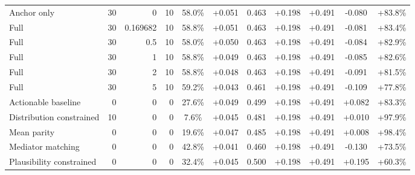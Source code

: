 \begin{table}[htbp]
\begin{tabular}{lrrrccccccc}
Anchor only & 30 & 0 & 10 & 58.0\% & +0.051 & 0.463 & +0.198 & +0.491 & -0.080 & +83.8\% \\
Full & 30 & 0.169682 & 10 & 58.8\% & +0.051 & 0.463 & +0.198 & +0.491 & -0.081 & +83.4\% \\
Full & 30 & 0.5 & 10 & 58.0\% & +0.050 & 0.463 & +0.198 & +0.491 & -0.084 & +82.9\% \\
Full & 30 & 1 & 10 & 58.8\% & +0.049 & 0.463 & +0.198 & +0.491 & -0.085 & +82.6\% \\
Full & 30 & 2 & 10 & 58.8\% & +0.048 & 0.463 & +0.198 & +0.491 & -0.091 & +81.5\% \\
Full & 30 & 5 & 10 & 59.2\% & +0.043 & 0.461 & +0.198 & +0.491 & -0.109 & +77.8\% \\
Actionable baseline & 0 & 0 & 0 & 27.6\% & +0.049 & 0.499 & +0.198 & +0.491 & +0.082 & +83.3\% \\
Distribution constrained & 10 & 0 & 0 & 7.6\% & +0.045 & 0.481 & +0.198 & +0.491 & +0.010 & +97.9\% \\
Mean parity & 0 & 0 & 0 & 19.6\% & +0.047 & 0.485 & +0.198 & +0.491 & +0.008 & +98.4\% \\
Mediator matching & 0 & 0 & 0 & 42.8\% & +0.041 & 0.460 & +0.198 & +0.491 & -0.130 & +73.5\% \\
Plausibility constrained & 0 & 0 & 0 & 32.4\% & +0.045 & 0.500 & +0.198 & +0.491 & +0.195 & +60.3\% \\
\bottomrule
\end{tabular}
\end{table}